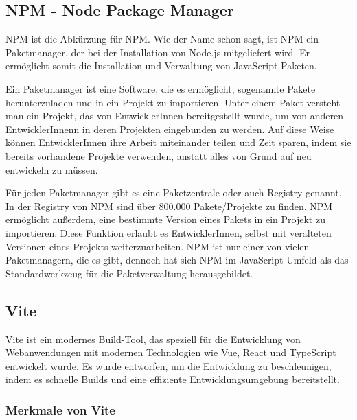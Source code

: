 \subsection{NPM - Node Package Manager}
\label{chapter:3-werkzeuge-npm}

\acs{NPM} ist die Abkürzung für \acf{NPM}. Wie der Name schon sagt, ist NPM ein Paketmanager, der bei der Installation von Node.js mitgeliefert wird. Er ermöglicht somit die Installation und Verwaltung von JavaScript-Paketen.

Ein Paketmanager ist eine Software, die es ermöglicht, sogenannte Pakete herunterzuladen und in ein Projekt zu importieren. Unter einem Paket versteht man ein Projekt, das von EntwicklerInnen bereitgestellt wurde, um von anderen EntwicklerInnenn in deren Projekten eingebunden zu werden. Auf diese Weise können EntwicklerInnen ihre Arbeit miteinander teilen und Zeit sparen, indem sie bereits vorhandene Projekte verwenden, anstatt alles von Grund auf neu entwickeln zu müssen.

Für jeden Paketmanager gibt es eine Paketzentrale oder auch Registry genannt. In der Registry von \acs{NPM} sind über 800.000 Pakete/Projekte zu finden. \acs{NPM} ermöglicht außerdem, eine bestimmte Version eines Pakets in ein Projekt zu importieren. Diese Funktion erlaubt es EntwicklerInnen, selbst mit veralteten Versionen eines Projekts weiterzuarbeiten. \acs{NPM} ist nur einer von vielen Paketmanagern, die es gibt, dennoch hat sich \acs{NPM} im JavaScript-Umfeld als das Standardwerkzeug für die Paketverwaltung herausgebildet.\cite{npm}

\subsection{Vite}

Vite ist ein modernes Build-Tool, das speziell für die Entwicklung von Webanwendungen mit modernen Technologien wie Vue, React und TypeScript entwickelt wurde. Es wurde entworfen, um die Entwicklung zu beschleunigen, indem es schnelle Builds und eine effiziente Entwicklungsumgebung bereitstellt. \cite{vitejs}

\subsubsection{Merkmale von Vite}

